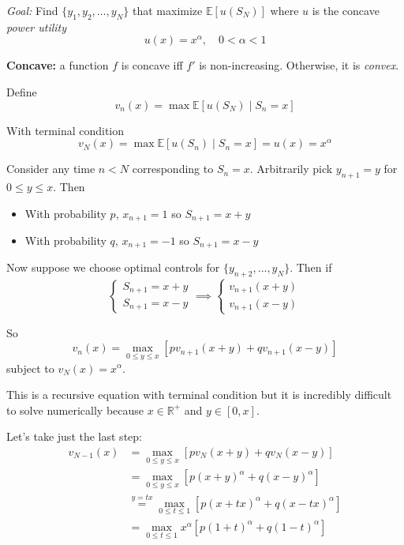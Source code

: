\documentclass[12pt]{report}
\newcommand{\R}{\mathbb{R}}
\newcommand{\E}{\mathbb{E}}
\begin{document}
        \emph{Goal:} Find $\{y_1, y_2, \dots, y_N\}$ that maximize $\E[u(S_N)]$ where $u$ is the concave \emph{power utility} 
        \[u(x) = x^{\alpha},\quad 0 < \alpha < 1\]

        \textbf{Concave:} a function $f$ is concave iff $f'$ is non-increasing. Otherwise, it is \emph{convex}. 
        
        Define 
        \[v_n(x) = \max \E[u(S_N)\; | \; S_n = x]\]

        With terminal condition 
        \[v_N(x) = \max \E[u(S_n) \; | \; S_n = x] = u(x) = x^{\alpha} \]

        Consider any time $n < N$ corresponding to $S_n = x$. Arbitrarily pick $y_{n+1} = y$ for $0 \leq y \leq x$. Then 
        \begin{itemize}
            \item With probability $p$, $x_{n+1} = 1$ so $S_{n+1} = x + y$
            \item With probability $q$, $x_{n+1} = -1$ so $S_{n+1} = x - y$
        \end{itemize}

        Now suppose we choose optimal controls for $\{y_{n+2}, \dots, y_N\}$. Then if
        \[\begin{cases}
            S_{n+1} = x + y\\ 
            S_{n+1} = x - y
        \end{cases} \implies \begin{cases}
            v_{n+1}(x + y)\\ 
            v_{n+1}(x - y)
        \end{cases}\] 
        
        So 
        \[v_n(x) = \max_{0 \leq y \leq x} [pv_{n+1}(x + y) + qv_{n+1}(x - y)]\]
        subject to $v_N(x) = x^{\alpha}$. 

        This is a recursive equation with terminal condition but it is incredibly difficult to solve numerically because $x \in \R^+$ and $y \in [0, x]$.

        Let's take just the last step:
        \begin{align*}
            v_{N-1}(x) &= \max_{0 \leq y \leq x} [pv_N(x + y) + qv_N(x - y)]\\ 
                &= \max_{0 \leq y \leq x} [p(x + y)^{\alpha} + q(x - y)^{\alpha}]\\ 
                &\overset{y = tx}{=} \max_{0 \leq t \leq 1} [p(x + tx)^{\alpha} + q(x - tx)^{\alpha}]\\
                &= \max_{0 \leq t \leq 1} x^{\alpha}[p(1 + t)^{\alpha} + q(1 - t)^{\alpha}]        
        \end{align*}
\end{document}
